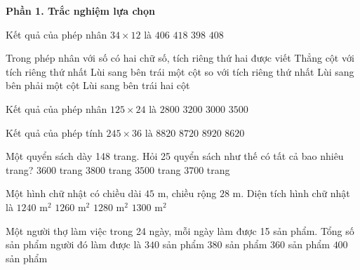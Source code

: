 \textbf{Phần 1. Trắc nghiệm lựa chọn}

\begin{ex} %
Kết quả của phép nhân $34 \times 12$ là
\choice
{$406$}
{$418$}
{$398$}
{\True $408$}
\end{ex}

\begin{ex} %
Trong phép nhân với số có hai chữ số, tích riêng thứ hai được viết
\choice
{Thẳng cột với tích riêng thứ nhất}
{\True Lùi sang bên trái một cột so với tích riêng thứ nhất}
{Lùi sang bên phải một cột}
{Lùi sang bên trái hai cột}
\end{ex}

\begin{ex} %
Kết quả của phép nhân $125 \times 24$ là
\choice
{$2800$}
{$3200$}
{\True $3000$}
{$3500$}
\end{ex}

\begin{ex} %
Kết quả của phép tính $245 \times 36$ là
\choice
{\True $8820$}
{$8720$}
{$8920$}
{$8620$}
\end{ex}

\begin{ex} %
Một quyển sách dày 148 trang. Hỏi 25 quyển sách như thế có tất cả bao nhiêu trang?
\choice
{$3600$ trang}
{$3800$ trang}
{$3500$ trang}
{\True $3700$ trang}
\end{ex}

\begin{ex} %
Một hình chữ nhật có chiều dài $45\text{ m}$, chiều rộng $28\text{ m}$. Diện tích hình chữ nhật là
\choice
{$1240\text{ m}^2$}
{\True $1260\text{ m}^2$}
{$1280\text{ m}^2$}
{$1300\text{ m}^2$}
\end{ex}

\begin{ex} %
Một người thợ làm việc trong 24 ngày, mỗi ngày làm được 15 sản phẩm. Tổng số sản phẩm người đó làm được là
\choice
{$340$ sản phẩm}
{$380$ sản phẩm}
{\True $360$ sản phẩm}
{$400$ sản phẩm}
\end{ex}

